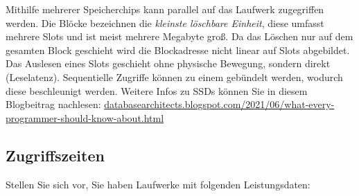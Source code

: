 \begin{solution}
	Mithilfe mehrerer Speicherchips kann parallel auf das Laufwerk zugegriffen werden.
	Die Blöcke bezeichnen die \textit{kleinste löschbare Einheit}, diese umfasst mehrere Slots und ist meist mehrere Megabyte groß.
	Da das Löschen nur auf dem gesamten Block geschieht wird die  Blockadresse nicht linear auf Slots abgebildet.
	Das Auslesen eines Slots geschieht ohne physische Bewegung, sondern direkt (Leselatenz).
	Sequentielle Zugriffe können zu einem gebündelt werden, wodurch diese beschleunigt werden.
	Weitere Infos zu SSDs können Sie in diesem Blogbeitrag nachlesen: \href{http://databasearchitects.blogspot.com/2021/06/what-every-programmer-should-know-about.html}{databasearchitects.blogspot.com/2021/06/what-every-programmer-should-know-about.html}
\end{solution}

\subsection{Zugriffszeiten}
\label{ZugriffFestplatten}
Stellen Sie sich vor, Sie haben Laufwerke mit folgenden Leistungsdaten:

